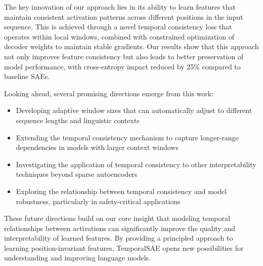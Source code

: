 \documentclass{article} %
\begin{document}
The key innovation of our approach lies in its ability to learn features that maintain consistent activation patterns across different positions in the input sequence. This is achieved through a novel temporal consistency loss that operates within local windows, combined with constrained optimization of decoder weights to maintain stable gradients. Our results show that this approach not only improves feature consistency but also leads to better preservation of model performance, with cross-entropy impact reduced by 25\% compared to baseline SAEs.

Looking ahead, several promising directions emerge from this work:
\begin{itemize}
    \item Developing adaptive window sizes that can automatically adjust to different sequence lengths and linguistic contexts
    \item Extending the temporal consistency mechanism to capture longer-range dependencies in models with larger context windows
    \item Investigating the application of temporal consistency to other interpretability techniques beyond sparse autoencoders
    \item Exploring the relationship between temporal consistency and model robustness, particularly in safety-critical applications
\end{itemize}

These future directions build on our core insight that modeling temporal relationships between activations can significantly improve the quality and interpretability of learned features. By providing a principled approach to learning position-invariant features, TemporalSAE opens new possibilities for understanding and improving language models.



\end{document}
